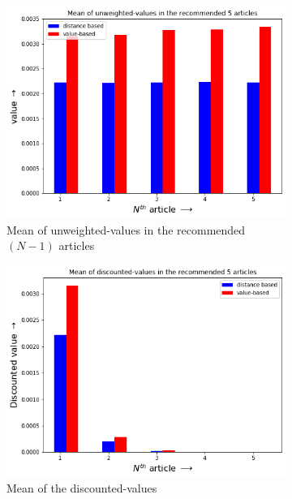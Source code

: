 \documentclass[11]{article}
\begin{document}
\begin{figure}[H]
	\centering
	\begin{subfigure}[t]{0.45\textwidth}
		\centering
		\includegraphics[width=1.1\linewidth]{images/value_abs_recomm.png} 
		\caption{Mean of unweighted-values in the recommended $(N-1)$ articles} \label{im:11}
	\end{subfigure}
	\hfill%
	\begin{subfigure}[t]{0.45\textwidth}
		\centering
		\includegraphics[width=1.1\linewidth]{images/value_weight_recomm.png}
		\caption{Mean of the discounted-values} \label{im:12}
	\end{subfigure}
	\begin{subfigure}[t]{0.49\textwidth}

\end{subfigure}
\end{figure}
\end{document}
